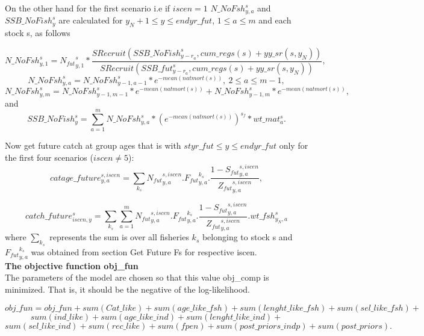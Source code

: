 \documentclass{article}
\begin{document}
On the other hand for the first scenario i.e if $iscen=1$ $N\_NoFsh^s_{y,a}$ and $SSB\_NoFish^s_y$ are calculated for $y_N+1\leq y \leq endyr\_fut$, $1\leq a \leq m$ and each stock s, as follows

\begin{equation}
    N\_NoFsh^{s}_{y,1}={N_{fut}}^s_{y,1}*\dfrac{SRecruit(SSB\_NoFish^s_{y-r_a},cum\_regs(s)+yy\_sr(s,y_N))}{ SRecruit(SSB\_fut^s_{y-r_a},cum\_regs(s)+yy\_sr(s,y_N))},
\end{equation}
\begin{equation}
    N\_NoFsh^{s}_{y,a}=N\_NoFsh^s_{y-1,a-1}*e^{-mean(natmort(s))}, \ 2\leq a\leq m-1,
\end{equation}
\begin{equation}
    N\_NoFsh^s_{y,m}=N\_NoFsh^s_{y-1,m-1}*e^{-mean(natmort(s))}+N\_NoFsh^s_{y-1,m}*e^{-mean(natmort(s))},
\end{equation}
and
\begin{equation}
    SSB\_NoFish^s_y   = \sum_{a=1}^mN\_NoFsh^s_{y,a}*(e^{-mean(natmort(s))})^{s_f} * wt\_{mat}^s_a.
\end{equation}

Now get future catch at group ages that is with $styr\_fut \leq y \leq endyr\_fut$ only for the first four scenarios ($iscen\neq 5$):
\begin{equation}
    catage\_future^{s,iscen}_{y,a}=\sum_{k_s} {N_{fut}}^{s,iscen}_{y,a}.{F_{fut}}^{k_s}_{y,a}.\dfrac{1-{S_{fut}}^{s,iscen}_{y,a}}{{Z_{fut}}^{s,iscen}_{y,a}},
\end{equation}

\begin{equation}
    catch\_future^s_{iscen,y}=\sum_{k_s} \sum_{a=1}^m{N_{fut}}^{s,iscen}_{y,a}.{F_{fut}}^{k_s}_{y,a}.\dfrac{1-{S_{fut}}^{s,iscen}_{y,a}}{{Z_{fut}}^{s,iscen}_{y,a}}.wt\_fsh^s_{y_N,a}
\end{equation}
where $\displaystyle\sum_{k_s}$ represents the sum is over all fisheries $k_s$ belonging to stock s and ${F_{fut}}^{k_s}_{y,a}$ was obtained from section Get Future Fs for respective iscen.\\

\textbf{The objective function obj\_fun}\\

The parameters of the model are chosen so that this value obj\_comp is minimized. That is, it should be the negative of the log-likelihood.

\begin{equation}
    obj\_fun=obj\_fun+sum(Cat\_like)+sum(age\_like\_fsh)+sum(lenght\_like\_fsh)+sum(sel\_like\_fsh)+
\end{equation}
\begin{equation*}
    sum(ind\_like)+sum(age\_like\_ind)+sum(lenght\_like\_ind)+
\end{equation*}
\begin{equation*}
    sum(sel\_like\_ind)+sum(rec\_like)+sum(fpen)+sum(post\_priors\_indp)+sum(post\_priors).
\end{equation*}
\end{document}
